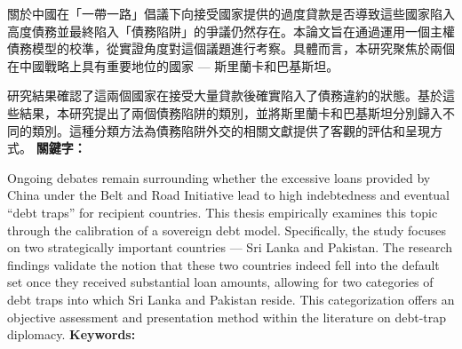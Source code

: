 \begin{abstractzh}
關於中國在「一帶一路」倡議下向接受國家提供的過度貸款是否導致這些國家陷入高度債務並最終陷入「債務陷阱」的爭議仍然存在。本論文旨在通過運用一個主權債務模型的校準，從實證角度對這個議題進行考察。具體而言，本研究聚焦於兩個在中國戰略上具有重要地位的國家 --- 斯里蘭卡和巴基斯坦。

研究結果確認了這兩個國家在接受大量貸款後確實陷入了債務違約的狀態。基於這些結果，本研究提出了兩個債務陷阱的類別，並將斯里蘭卡和巴基斯坦分別歸入不同的類別。這種分類方法為債務陷阱外交的相關文獻提供了客觀的評估和呈現方式。
\bigbreak
\noindent \textbf{關鍵字：}{\, \makeatletter \@keywordszh \makeatother}
\end{abstractzh}

\begin{abstracten}

    Ongoing debates remain surrounding whether the excessive loans provided by China under the Belt and Road Initiative lead to high indebtedness and eventual ``debt traps'' for recipient countries. This thesis empirically examines this topic through the calibration of a sovereign debt model. Specifically, the study focuses on two strategically important countries --- Sri Lanka and Pakistan.
    The research findings validate the notion that these two countries indeed fell into the default set once they received substantial loan amounts, allowing for two categories of debt traps into which Sri Lanka and Pakistan reside. This categorization offers an objective assessment and presentation method within the literature on debt-trap diplomacy.
    \bigbreak
\noindent \textbf{Keywords:}{\, \makeatletter \@keywordsen \makeatother}
\end{abstracten}

\begin{comment}
\category{I2.10}{Computing Methodologies}{Artificial Intelligence --
Vision and Scene Understanding} \category{H5.3}{Information
Systems}{Information Interfaces and Presentation (HCI) -- Web-based
Interaction.}

\terms{Design, Human factors, Performance.}

\keywords{Region of interest, Visual attention model, Web-based
games, Benchmarks.}
\end{comment}
